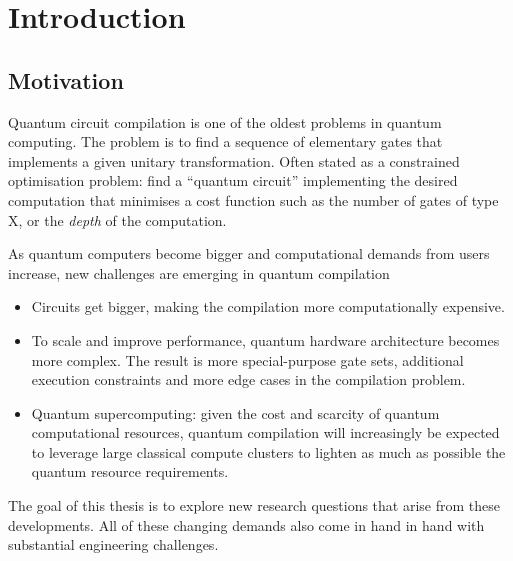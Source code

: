 

\chapter{Introduction}\label{ch:1-intro}


\section{Motivation}
Quantum circuit compilation is one of the oldest problems in quantum computing.
The problem is to find a sequence of elementary gates that implements a given unitary transformation.
Often stated as a constrained optimisation problem: find a ``quantum circuit'' implementing
the desired computation that minimises a cost function such as the number of gates
of type X, or the \emph{depth} of the computation.

As quantum computers become bigger and computational demands from users increase,
new challenges are emerging in quantum compilation 
\begin{itemize}
  \item Circuits get bigger, making the compilation more computationally expensive.
  \item To scale and improve performance, quantum hardware architecture becomes more complex.
  The result is more special-purpose gate sets, additional execution constraints and more edge cases
  in the compilation problem.
  \item Quantum supercomputing: given the cost and scarcity of quantum computational
  resources, quantum compilation will increasingly be expected to leverage large
  classical compute clusters to lighten as much as possible the quantum resource requirements.
\end{itemize}
The goal of this thesis is to explore new research questions that arise from these developments.
All of these changing demands also come in hand in hand with substantial engineering challenges.

